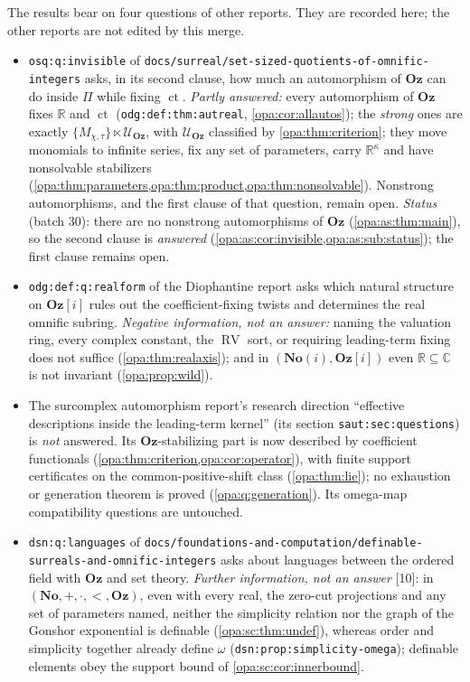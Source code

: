 \documentclass[11pt,oneside]{article}
\numberwithin{equation}{section}
\theoremstyle{definition}
\theoremstyle{remark}
\newcommand{\No}{\mathbf{No}}
\newcommand{\Oz}{\mathbf{Oz}}
\newcommand{\Og}{\mathbf{Oz}[i]}
\newcommand{\SC}{\mathbf{No}(i)}
\newcommand{\R}{\mathbb R}
\newcommand{\C}{\mathbb C}
\newcommand{\UU}{\mathcal U}
\newcommand{\ct}{\operatorname{ct}}
\newcommand{\RV}{\operatorname{RV}}
\newcommand{\src}[1]{\textup{\textsf{\small[#1]}}}
\newcommand{\lbl}[1]{\nolinkurl{#1}}
\newcommand{\fn}[1]{\nolinkurl{#1}}
\begin{document}
The results bear on four questions of other reports. They are recorded here;
the other reports are not edited by this merge.
\begin{itemize}[itemsep=2pt]
\item \lbl{osq:q:invisible} of \fn{docs/surreal/set-sized-quotients-of-omnific-integers}
asks, in its second clause, how much an automorphism of $\Oz$ can do inside $\Pi$
while fixing $\ct$. \emph{Partly answered:} every automorphism of $\Oz$ fixes $\R$
and $\ct$ (\lbl{odg:def:thm:autreal}, \cref{opa:cor:allautos}); the \emph{strong}
ones are exactly $\{M_{\chi,\tau}\}\ltimes\UU_\Oz$, with $\UU_\Oz$ classified by
\cref{opa:thm:criterion}; they move monomials to infinite series, fix any set of
parameters, carry $\R^\kappa$ and have nonsolvable stabilizers
(\cref{opa:thm:parameters,opa:thm:product,opa:thm:nonsolvable}). Nonstrong
automorphisms, and the first clause of that question, remain open.
\emph{Status} (batch 30): there are no nonstrong automorphisms of $\Oz$
(\cref{opa:as:thm:main}), so the second clause is \emph{answered}
(\cref{opa:as:cor:invisible,opa:as:sub:status}); the first clause remains open.
\item \lbl{odg:def:q:realform} of the Diophantine report asks which natural
structure on $\Og$ rules out the coefficient-fixing twists and determines the real
omnific subring. \emph{Negative information, not an answer:} naming the valuation
ring, every complex constant, the $\RV$ sort, or requiring leading-term fixing does
not suffice (\cref{opa:thm:realaxis}); and in $(\SC,\Og)$ even $\R\subseteq\C$ is not
invariant (\cref{opa:prop:wild}).
\item The surcomplex automorphism report's research direction ``effective
descriptions inside the leading-term kernel'' (its section \lbl{saut:sec:questions})
is \emph{not} answered. Its $\Oz$-stabilizing part is now described by coefficient
functionals (\cref{opa:thm:criterion,opa:cor:operator}), with finite support
certificates on the common-positive-shift class (\cref{opa:thm:lie}); no
exhaustion or generation theorem is proved (\cref{opa:q:generation}). Its
omega-map compatibility questions are untouched.
\item \lbl{dsn:q:languages} of
\fn{docs/foundations-and-computation/definable-surreals-and-omnific-integers}
asks about languages between the ordered field with $\Oz$ and set theory.
\emph{Further information, not an answer} \src{10}: in
$(\No,+,\cdot,<,\Oz)$, even with every real, the zero-cut projections and any
set of parameters named, neither the simplicity relation nor the graph of the
Gonshor exponential is definable (\cref{opa:sc:thm:undef}), whereas order and
simplicity together already define $\omega$ (\lbl{dsn:prop:simplicity-omega});
definable elements obey the support bound of \cref{opa:sc:cor:innerbound}.
\end{itemize}
\end{document}
